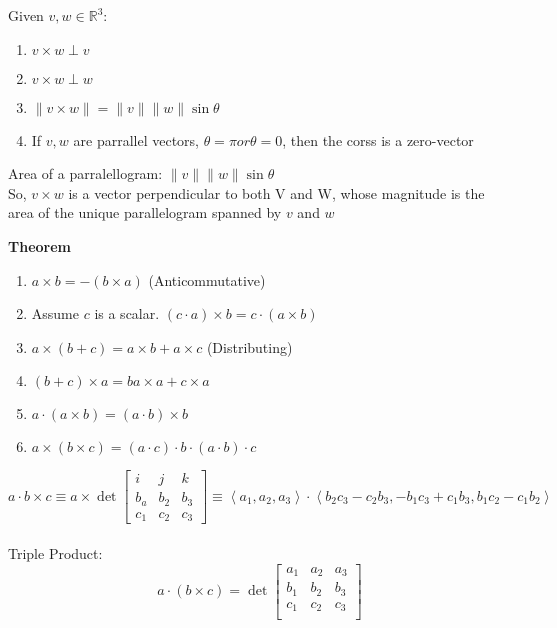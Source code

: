 \documentclass[]{article}
\begin{document}
    Given $v, w \in \mathbb{R}^3$:
    \begin{enumerate}
        \item $v\times w \perp v$
        \item $v\times w \perp w$
        \item $\left\lVert v\times w \right\rVert = \|v\|\|w\|\sin\theta$
        \item If $v, w$ are parrallel vectors, $\theta = \pi or \theta = 0$, then the corss is a zero-vector
    \end{enumerate}

    Area of a parralellogram: $\|v\|\|w\|\sin\theta$\\
    So, $v\times w$ is a vector perpendicular to both V and W, whose magnitude is the area of the unique parallelogram spanned by $v$ and $w$


    \textbf{Theorem}
    \begin{enumerate}
        \item $a\times b = -(b\times a)$ (Anticommutative)
        \item Assume $c$ is a scalar. $(c \cdot a) \times b = c\cdot(a\times b)$
        \item $a\times(b+c) = a\times b + a\times c$ (Distributing)
        \item $(b+c)\times a =ba\times a + c\times a$ 
        \item $a\cdot (a\times b) = (a\cdot b) \times b$
        \item $a\times(b\times c) = (a\cdot c) \cdot b \cdot (a\cdot b)\cdot c$
    \end{enumerate}

    $$ a\cdot b \times c \equiv a\times \det\begin{bmatrix}
        i&j&k\\
        b_a&b_2&b_3\\
        c_1&c_2&c_3
    \end{bmatrix} \equiv \left\langle a_1,a_2,a_3 \right\rangle \cdot \left\langle b_2c_3-c_2b_3,-b_1c_3+c_1b_3, b_1c_2-c_1b_2\right\rangle$$\\
    Triple Product:
    $$a \cdot (b \times c) = \det \begin{bmatrix}
        a_1&a_2&a_3\\b_1&b_2&b_3\\c_1&c_2&c_3\\
    \end{bmatrix}$$
\end{document}
